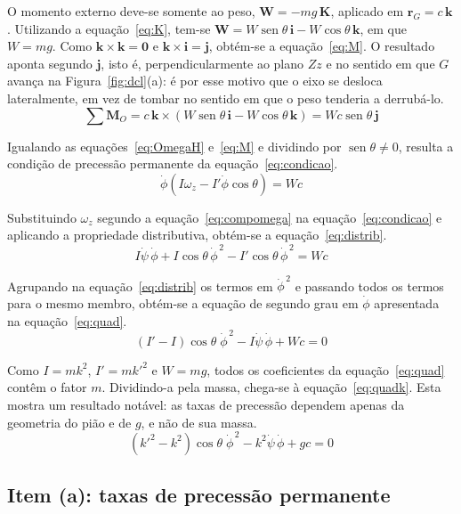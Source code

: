 \documentclass[12pt,a4paper]{article}
\newcommand{\vet}[1]{\mathbf{#1}}
\newcommand{\seno}{\operatorname{sen}}
\newcommand{\phid}{\dot{\phi}}
\newcommand{\psid}{\dot{\psi}}
\begin{document}
O momento externo deve-se somente ao peso, $\vet{W}=-mg\,\vet{K}$, aplicado em $\vet{r}_G=c\,\vet{k}$. Utilizando a equação~\ref{eq:K}, tem-se $\vet{W}=W\seno\theta\,\vet{i}-W\cos\theta\,\vet{k}$, em que $W=mg$. Como $\vet{k}\times\vet{k}=\vet{0}$ e $\vet{k}\times\vet{i}=\vet{j}$, obtém-se a equação~\ref{eq:M}. O resultado aponta segundo $\vet{j}$, isto é, perpendicularmente ao plano $Zz$ e no sentido em que $G$ avança na Figura~\ref{fig:dcl}(a): é por esse motivo que o eixo se desloca lateralmente, em vez de tombar no sentido em que o peso tenderia a derrubá-lo.
\begin{equation}
\sum\vet{M}_O = c\,\vet{k}\times\left(W\seno\theta\,\vet{i}-W\cos\theta\,\vet{k}\right) = Wc\seno\theta\,\vet{j}
\label{eq:M}
\end{equation}

Igualando as equações~\ref{eq:OmegaH} e~\ref{eq:M} e dividindo por $\seno\theta\neq0$, resulta a condição de precessão permanente da equação~\ref{eq:condicao}.
\begin{equation}
\phid\left(I\omega_z - I'\phid\cos\theta\right) = Wc
\label{eq:condicao}
\end{equation}

Substituindo $\omega_z$ segundo a equação~\ref{eq:compomega} na equação~\ref{eq:condicao} e aplicando a propriedade distributiva, obtém-se a equação~\ref{eq:distrib}.
\begin{equation}
I\psid\,\phid+I\cos\theta\,\phid^{\,2}-I'\cos\theta\,\phid^{\,2}=Wc
\label{eq:distrib}
\end{equation}

Agrupando na equação~\ref{eq:distrib} os termos em $\phid^{\,2}$ e passando todos os termos para o mesmo membro, obtém-se a equação de segundo grau em $\phid$ apresentada na equação~\ref{eq:quad}.
\begin{equation}
(I'-I)\cos\theta\;\phid^{\,2} - I\psid\,\phid + Wc = 0
\label{eq:quad}
\end{equation}

Como $I=mk^2$, $I'=mk'^2$ e $W=mg$, todos os coeficientes da equação~\ref{eq:quad} contêm o fator $m$. Dividindo-a pela massa, chega-se à equação~\ref{eq:quadk}. Esta mostra um resultado notável: as taxas de precessão dependem apenas da geometria do pião e de $g$, e não de sua massa.
\begin{equation}
(k'^2-k^2)\cos\theta\;\phid^{\,2} - k^2\psid\,\phid + gc = 0
\label{eq:quadk}
\end{equation}

\subsection{Item (a): taxas de precessão permanente}
\end{document}
